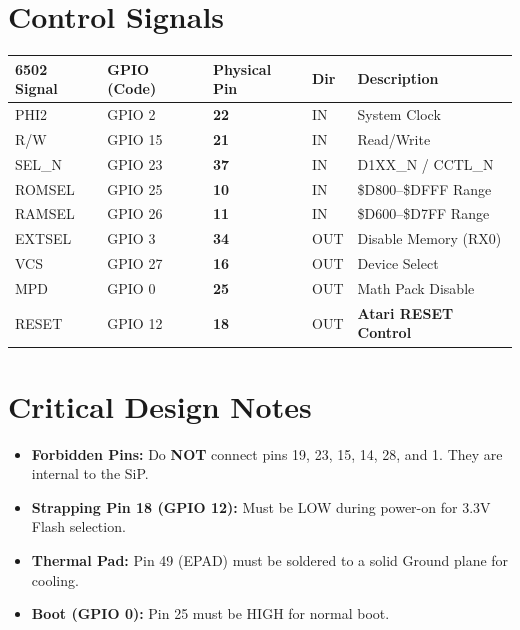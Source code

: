 \documentclass[a4paper,10pt]{article}
\begin{document}
\section{Control Signals}
\begin{table}[h!]
\centering
\begin{tabular}{@{}lllll@{}}
\toprule
\textbf{6502 Signal} & \textbf{GPIO (Code)} & \textbf{Physical Pin} & \textbf{Dir} & \textbf{Description} \\ \midrule
PHI2                 & GPIO 2              & \textbf{22}          & IN           & System Clock         \\
R/W                  & GPIO 15             & \textbf{21}          & IN           & Read/Write           \\
SEL\_N               & GPIO 23             & \textbf{37}          & IN           & D1XX\_N / CCTL\_N    \\
ROMSEL               & GPIO 25             & \textbf{10}          & IN           & \$D800--\$DFFF Range \\
RAMSEL               & GPIO 26             & \textbf{11}          & IN           & \$D600--\$D7FF Range \\
EXTSEL               & GPIO 3              & \textbf{34}          & OUT          & Disable Memory (RX0) \\
VCS                  & GPIO 27             & \textbf{16}          & OUT          & Device Select        \\
MPD                  & GPIO 0              & \textbf{25}          & OUT          & Math Pack Disable    \\
RESET                & GPIO 12             & \textbf{18}          & OUT          & \textbf{Atari RESET Control} \\ \bottomrule
\end{tabular}
\end{table}

\section{Critical Design Notes}
\begin{itemize}
    \item \textbf{Forbidden Pins:} Do \textbf{NOT} connect pins 19, 23, 15, 14, 28, and 1. They are internal to the SiP.
    \item \textbf{Strapping Pin 18 (GPIO 12):} Must be LOW during power-on for 3.3V Flash selection.
    \item \textbf{Thermal Pad:} Pin 49 (EPAD) must be soldered to a solid Ground plane for cooling.
    \item \textbf{Boot (GPIO 0):} Pin 25 must be HIGH for normal boot.
\end{itemize}
\end{document}
